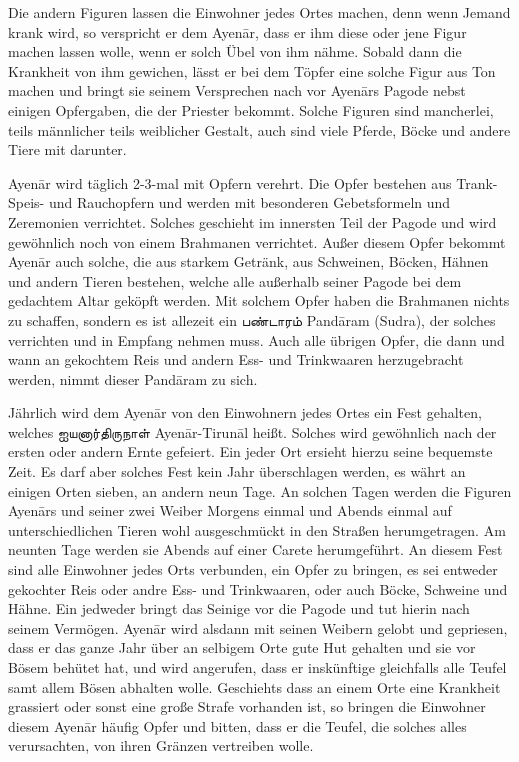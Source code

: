 \documentclass{article}
\newcommand{\TamilText}[1]{\texttamil{#1}}
\newcommand{\tam}[1]{\TamilText{#1}}
\begin{document}
Die andern Figuren lassen die Einwohner jedes Ortes machen, denn wenn Jemand krank wird, so verspricht er dem Ayen\={a}r, dass er ihm diese oder jene Figur machen lassen wolle, wenn er solch Übel von ihm nähme. Sobald dann die Krankheit von ihm gewichen, lässt er bei dem Töpfer eine solche Figur aus Ton machen und bringt sie seinem Versprechen nach vor Ayen\={a}rs Pagode nebst einigen Opfergaben, die der Priester bekommt. Solche Figuren sind mancherlei, teils männlicher teils weiblicher Gestalt, auch sind viele Pferde, Böcke und andere Tiere mit darunter.

Ayen\={a}r wird täglich 2-3-mal mit Opfern verehrt. Die Opfer bestehen aus Trank- Speis- und Rauchopfern und werden mit besonderen Gebetsformeln und Zeremonien verrichtet. Solches geschieht im innersten Teil der Pagode und wird gewöhnlich noch von einem Brahmanen verrichtet. Außer diesem Opfer bekommt Ayen\={a}r auch solche, die aus starkem Getränk, aus Schweinen, Böcken, Hähnen und andern Tieren bestehen, welche alle außerhalb seiner Pagode bei dem gedachtem Altar geköpft werden. Mit solchem Opfer haben die Brahmanen nichts zu schaffen, sondern es ist allezeit ein \tam{பண்டாரம்} Pand\={a}ram (Sudra), der solches verrichten und in Empfang nehmen muss. Auch alle übrigen Opfer, die dann und wann an gekochtem Reis und andern Ess- und Trinkwaaren herzugebracht werden, nimmt dieser Pand\={a}ram zu sich.

Jährlich wird dem Ayen\={a}r von den Einwohnern jedes Ortes ein Fest gehalten, welches \tam{ஐயனார்திருநாள்} Ayen\={a}r-Tirun\={a}l heißt. Solches wird gewöhnlich nach der ersten oder andern Ernte gefeiert. Ein jeder Ort ersieht hierzu seine bequemste Zeit. Es darf aber solches Fest kein Jahr überschlagen werden, es währt an einigen Orten sieben, an andern neun Tage. An solchen Tagen werden die Figuren Ayen\={a}rs und seiner zwei Weiber Morgens einmal und Abends einmal auf unterschiedlichen Tieren wohl ausgeschmückt in den Straßen herumgetragen. Am neunten Tage werden sie Abends auf einer Carete herumgeführt. An diesem Fest sind alle Einwohner jedes Orts verbunden, ein Opfer zu bringen, es sei entweder gekochter Reis oder andre Ess- und Trinkwaaren, oder auch Böcke, Schweine und Hähne. Ein jedweder bringt das Seinige vor die Pagode und tut hierin nach seinem Vermögen. Ayen\={a}r wird alsdann mit seinen Weibern gelobt und gepriesen, dass er das ganze Jahr über an selbigem Orte gute Hut gehalten und sie vor Bösem behütet hat, und wird angerufen, dass er inskünftige gleichfalls alle Teufel samt allem Bösen abhalten wolle. Geschiehts dass an einem Orte eine Krankheit grassiert oder sonst eine große Strafe vorhanden ist, so bringen die Einwohner diesem Ayen\={a}r häufig Opfer und bitten, dass er die Teufel, die solches alles verursachten, von ihren Gränzen vertreiben wolle.
\end{document}
